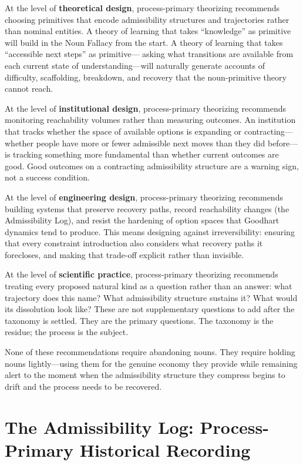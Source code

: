 \documentclass[12pt, a4paper]{article}
\theoremstyle{plain}
\theoremstyle{definition}
\theoremstyle{remark}
\begin{document}
At the level of \textbf{theoretical design}, process-primary theorizing
recommends choosing primitives that encode admissibility structures and
trajectories rather than nominal entities. A theory of learning that takes
``knowledge'' as primitive will build in the Noun Fallacy from the start.
A theory of learning that takes ``accessible next steps'' as primitive---
asking what transitions are available from each current state of
understanding---will naturally generate accounts of difficulty, scaffolding,
breakdown, and recovery that the noun-primitive theory cannot reach.

At the level of \textbf{institutional design}, process-primary theorizing
recommends monitoring reachability volumes rather than measuring outcomes.
An institution that tracks whether the space of available options is expanding
or contracting---whether people have more or fewer admissible next moves than
they did before---is tracking something more fundamental than whether current
outcomes are good. Good outcomes on a contracting admissibility structure
are a warning sign, not a success condition.

At the level of \textbf{engineering design}, process-primary theorizing
recommends building systems that preserve recovery paths, record reachability
changes (the Admissibility Log), and resist the hardening of option spaces
that Goodhart dynamics tend to produce. This means designing against
irreversibility: ensuring that every constraint introduction also considers
what recovery paths it forecloses, and making that trade-off explicit rather
than invisible.

At the level of \textbf{scientific practice}, process-primary theorizing
recommends treating every proposed natural kind as a question rather than
an answer: what trajectory does this name? What admissibility structure
sustains it? What would its dissolution look like? These are not
supplementary questions to add after the taxonomy is settled. They are the
primary questions. The taxonomy is the residue; the process is the subject.

None of these recommendations require abandoning nouns. They require holding
nouns lightly---using them for the genuine economy they provide while remaining
alert to the moment when the admissibility structure they compress begins to
drift and the process needs to be recovered.

\section{The Admissibility Log: Process-Primary Historical Recording}
\label{sec:admlog}
\end{document}
